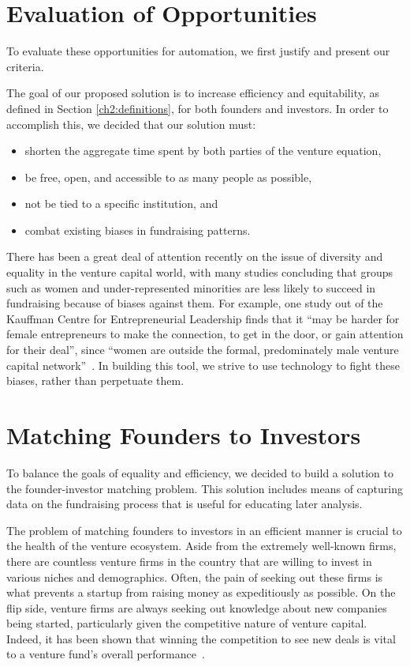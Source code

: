 \section{Evaluation of Opportunities}

To evaluate these opportunities for automation, we first justify and present our criteria.

The goal of our proposed solution is to increase efficiency and equitability, as defined in Section \ref{ch2:definitions}, for both founders and investors. In order to accomplish this, we decided that our solution must:

\begin{itemize}
  \item shorten the aggregate time spent by both parties of the venture equation,
  \item be free, open, and accessible to as many people as possible,
  \item not be tied to a specific institution, and
  \item combat existing biases in fundraising patterns.
\end{itemize}

There has been a great deal of attention recently on the issue of diversity and equality in the venture capital world, with many studies concluding that groups such as women and under-represented minorities are less likely to succeed in fundraising because of biases against them. For example, one study out of the Kauffman Centre for Entrepreneurial Leadership finds that it ``may be harder for female entrepreneurs to make the connection, to get in the door, or gain attention for their deal'', since ``women are outside the formal, predominately male venture capital network''~\cite{doi:10.1080/13691060118175}. In building this tool, we strive to use technology to fight these biases, rather than perpetuate them.

\section{Matching Founders to Investors}
\label{ch2:matching}

To balance the goals of equality and efficiency, we decided to build a solution to the founder-investor matching problem. This solution includes means of capturing data on the fundraising process that is useful for educating later analysis.

The problem of matching founders to investors in an efficient manner is crucial to the health of the venture ecosystem. Aside from the extremely well-known firms, there are countless venture firms in the country that are willing to invest in various niches and demographics. Often, the pain of seeking out these firms is what prevents a startup from raising money as expeditiously as possible. On the flip side, venture firms are always seeking out knowledge about new companies being started, particularly given the competitive nature of venture capital. Indeed, it has been shown that winning the competition to see new deals is vital to a venture fund's overall performance~\cite{doi:10.1111/j.1540-6261.2007.01207.x}.

